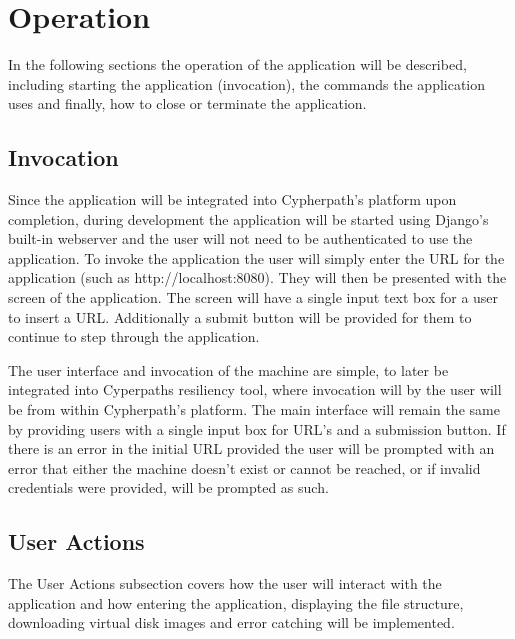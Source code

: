 \documentclass{article}
\begin{document}
    \section{Operation}
    In the following sections the operation of the application will be described, including starting the application
    (invocation), the commands the application uses and finally, how to close or terminate the application.

        \subsection{Invocation}
        Since the application will be integrated into Cypherpath's platform upon completion, during development the application will be started using Django's built-in webserver and
        the user will not need to be authenticated to use the application. To invoke the application the user will simply enter the URL for the application (such as http://localhost:8080).
        They will then be presented with the screen of the application. The screen will have a single input text box for a user to insert a URL. Additionally 
        a submit button will be provided for them to continue to step through the application. 

        The user interface and invocation of the machine are simple, to later be integrated into Cyperpaths resiliency tool, where invocation will by the user will be from within Cypherpath's
        platform. The main interface will remain the same by providing users with a single input box for URL's and a submission button.
        If there is an error in the initial URL provided the user will be prompted with an error that either the machine doesn't exist or cannot be reached, or if invalid credentials 
        were provided, will be prompted as such.

        \subsection{User Actions}
        The User Actions subsection covers how the user will interact with the application and how entering the application, displaying the file structure, downloading virtual disk images and error catching 
        will be implemented.
\end{document}
